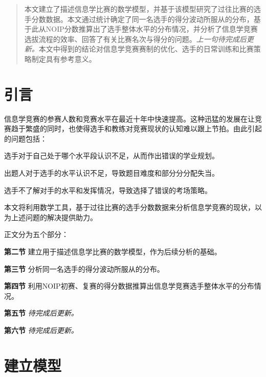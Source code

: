 \begin{abstract}
    本文建立了描述信息学比赛的数学模型，并基于该模型研究了过往比赛的选手分数数据。本文通过统计确定了同一名选手的得分波动所服从的分布，基于此从NOIP分数推算出了选手整体水平的分布情况，并分析了信息学竞赛选拔流程的效率、回答了有关比赛名次与得分的问题。\emph{上一句待完成后更新。}本文中得到的结论对信息学竞赛赛制的优化、选手的日常训练和比赛策略制定具有参考意义。
\end{abstract}

\section{引言}

    信息学竞赛的参赛人数和竞赛水平在最近十年中快速提高。这种迅猛的发展在让竞赛趋于繁盛的同时，也使得选手和教练对竞赛现状的认知难以跟上节拍。由此引起的问题包括：

    \begin{asparaitem}
        \item {选手对于自己处于哪个水平段认识不足，从而作出错误的学业规划。}
        \item {出题人对于选手的水平认识不足，导致题目难度和部分分分配失当。}
        \item {选手不了解对手的水平和发挥情况，导致选择了错误的考场策略。}
    \end{asparaitem}

    本文将利用数学工具，基于过往比赛的选手分数数据来分析信息学竞赛的现状，以为上述问题的解决提供助力。

    正文分为五个部分：

    \begin{asparaenum}
        \item [\textbf{第二节}]{建立用于描述信息学比赛的数学模型，作为后续分析的基础。}
        \item [\textbf{第三节}]{分析同一名选手的得分波动所服从的分布。}
        \item [\textbf{第四节}]{利用NOIP初赛、复赛的得分数据推算出信息学竞赛选手整体水平的分布情况。}
        \item [\textbf{第五节}]{\emph{待完成后更新。}}
        \item [\textbf{第六节}]{\emph{待完成后更新。}}
    \end{asparaenum}

\section{建立模型}

